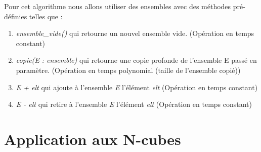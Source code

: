 \documentclass[a4paper, 11pt]{article}
\begin{document}
    Pour cet algorithme nous allons utiliser des ensembles avec des méthodes pré-définies telles que :
    \begin{enumerate}
        \item \emph{ensemble\_vide()} qui retourne un nouvel ensemble vide. (Opération en temps constant)
        \item \emph{copie(E : ensemble)} qui retourne une copie profonde de l'ensemble E passé en paramètre. (Opération en temps polynomial (taille de l'ensemble copié))
        \item \emph{E + elt} qui ajoute à l'ensemble \emph{E} l'élément \emph{elt} (Opération en temps constant)
        \item \emph{E - elt} qui retire à l'ensemble \emph{E} l'élément \emph{elt} (Opération en temps constant)
    \end{enumerate}

    \newpage
    

    \newpage
    \section{Application aux N-cubes}\label{sec:application-aux-n-cubes}
\end{document}
